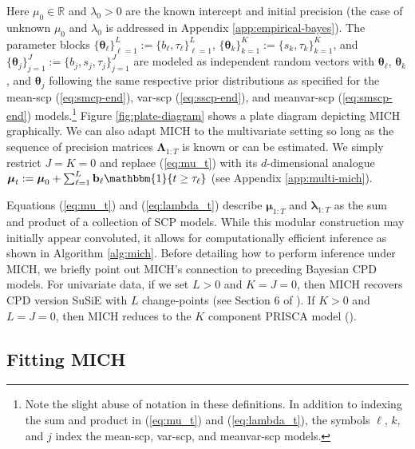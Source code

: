 Here $\mu_0 \in\mathbb{R}$ and $\lambda_0 > 0$ are the known intercept and initial precision (the case of unknown $\mu_0$ and $\lambda_0$ is addressed in Appendix \ref{app:empirical-bayes}). The parameter blocks $\{\boldsymbol{\theta}_\ell\}_{\ell=1}^L := \{b_\ell, \tau_\ell\}_{\ell=1}^L$, $\{\boldsymbol{\theta}_k\}_{k=1}^K := \{s_k, \tau_k\}_{k=1}^K$, and $\{\boldsymbol{\theta}_j\}_{j=1}^J := \{b_j, s_j, \tau_j\}_{j=1}^J$ are modeled as independent random vectors with $\boldsymbol{\theta}_\ell$, $\boldsymbol{\theta}_k$, and $\boldsymbol{\theta}_j$ following the same respective prior distributions as specified for the mean-scp (\ref{eq:smcp-end}), var-scp (\ref{eq:sscp-end}), and meanvar-scp (\ref{eq:smscp-end}) models.\footnote{Note the slight abuse of notation in these definitions. In addition to indexing the sum and product in (\ref{eq:mu_t}) and (\ref{eq:lambda_t}), the symbols $\ell$, $k$, and $j$ index the mean-scp, var-scp, and meanvar-scp models.} Figure \ref{fig:plate-diagram} shows a plate diagram depicting MICH graphically. We can also adapt MICH to the multivariate setting so long as the sequence of precision matrices $\boldsymbol{\Lambda}_{1:T}$ is  known or can be estimated. We simply restrict $J=K=0$ and replace (\ref{eq:mu_t}) with its $d$-dimensional analogue $\boldsymbol{\mu}_{t} :=\boldsymbol{\mu}_0+ \sum_{\ell = 1}^L \mathbf{b}_\ell\mathbbm{1}\{t \geq\tau_\ell\}$ (see Appendix \ref{app:multi-mich}). 

Equations (\ref{eq:mu_t}) and (\ref{eq:lambda_t}) describe $\boldsymbol{\mu}_{1:T}$ and $\boldsymbol{\lambda}_{1:T}$ as the sum and product of a collection of SCP models. While this modular construction may initially appear convoluted, it allows for computationally efficient inference as shown in Algorithm \ref{alg:mich}. Before detailing how to perform inference under MICH, we briefly point out MICH's connection to preceding Bayesian CPD models. For univariate data, if we set $L > 0$ and $K=J=0$, then MICH recovers CPD version SuSiE with $L$ change-points (see Section 6 of \cite{Wang20}). If $K > 0$ and $L=J=0$, then MICH reduces to the $K$ component PRISCA model (\citealp{Cappello22}). 


\subsection{Fitting MICH}
\label{sec:fit-mich}

